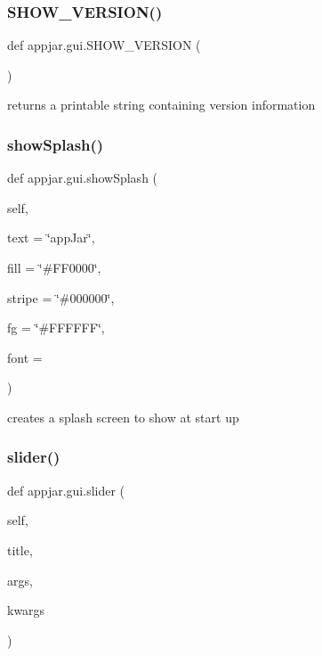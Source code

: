 \begin{DoxyVerb}
\subsubsection{\texorpdfstring{S\+H\+O\+W\+\_\+\+V\+E\+R\+S\+I\+O\+N()}{SHOW\_VERSION()}}
{\footnotesize\ttfamily def appjar.\+gui.\+S\+H\+O\+W\+\_\+\+V\+E\+R\+S\+I\+ON (\begin{DoxyParamCaption}{ }\end{DoxyParamCaption})\hspace{0.3cm}{\ttfamily [static]}}

\begin{DoxyVerb}returns a printable string containing version information \end{DoxyVerb}
 \mbox{\label{classappjar_1_1gui_a3bd652a233894c5e787a2c1fa2060dad}} 
\subsubsection{\texorpdfstring{show\+Splash()}{showSplash()}}
{\footnotesize\ttfamily def appjar.\+gui.\+show\+Splash (\begin{DoxyParamCaption}\item[{}]{self,  }\item[{}]{text = {\ttfamily \char`\"{}appJar\char`\"{}},  }\item[{}]{fill = {\ttfamily \char`\"{}\#FF0000\char`\"{}},  }\item[{}]{stripe = {\ttfamily \char`\"{}\#000000\char`\"{}},  }\item[{}]{fg = {\ttfamily \char`\"{}\#FFFFFF\char`\"{}},  }\item[{}]{font = {} }\end{DoxyParamCaption})}

\begin{DoxyVerb}creates a splash screen to show at start up \end{DoxyVerb}
 \mbox{\label{classappjar_1_1gui_aea5794cdc78c322ec39b169c7e823347}} 
\subsubsection{\texorpdfstring{slider()}{slider()}}
{\footnotesize\ttfamily def appjar.\+gui.\+slider (\begin{DoxyParamCaption}\item[{}]{self,  }\item[{}]{title,  }\item[{}]{args,  }\item[{}]{kwargs }\end{DoxyParamCaption})}




\end{DoxyVerb}
